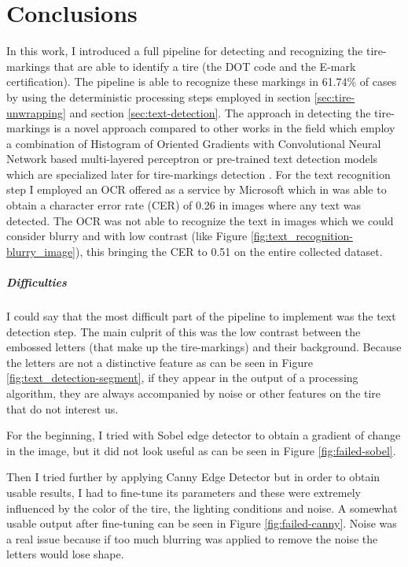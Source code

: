 \chapter{Conclusions}\pagestyle{fancy}\setlength{\parindent}{3em}
\label{chap:conclusions}

In this work, I introduced a full pipeline for detecting and recognizing the tire-markings that are able to identify a tire (the DOT code and the E-mark certification). The pipeline is able to recognize these markings in 61.74\% of cases by using the deterministic processing steps employed in section \ref{sec:tire-unwrapping} and section \ref{sec:text-detection}. The approach in detecting the tire-markings is a novel approach compared to other works in the field which employ a combination of Histogram of Oriented Gradients with Convolutional Neural Network based multi-layered perceptron \cite{article:1} or pre-trained text detection models which are specialized later for tire-markings detection \cite{site:0}. For the text recognition step I employed an OCR offered as a service by Microsoft \cite{site:Microsoft_Cognitive_Services} which in was able to obtain a character error rate (CER) of 0.26 in images where any text was detected. The OCR was not able to recognize the text in images which we could consider blurry and with low contrast (like Figure \ref{fig:text_recognition-blurry_image}), this bringing the CER to 0.51 on the entire collected dataset.

\paragraph{Difficulties}\mbox{}\par

I could say that the most difficult part of the pipeline to implement was the text detection step. The main culprit of this was the low contrast between the embossed letters (that make up the tire-markings) and their background. Because the letters are not a distinctive feature as can be seen in Figure \ref{fig:text_detection-segment}, if they appear in the output of a processing algorithm, they are always accompanied by noise or other features on the tire that do not interest us.

For the beginning, I tried with Sobel edge detector \cite{article:sobel_edge_detector} to obtain a gradient of change in the image, but it did not look useful as can be seen in Figure \ref{fig:failed-sobel}.

Then I tried further by applying Canny Edge Detector \cite{site:Canny_edge_detection} but in order to obtain usable results, I had to fine-tune its parameters and these were extremely influenced by the color of the tire, the lighting conditions and noise. A somewhat usable output after fine-tuning can be seen in Figure \ref{fig:failed-canny}. Noise was a real issue because if too much blurring was applied to remove the noise the letters would lose shape.

